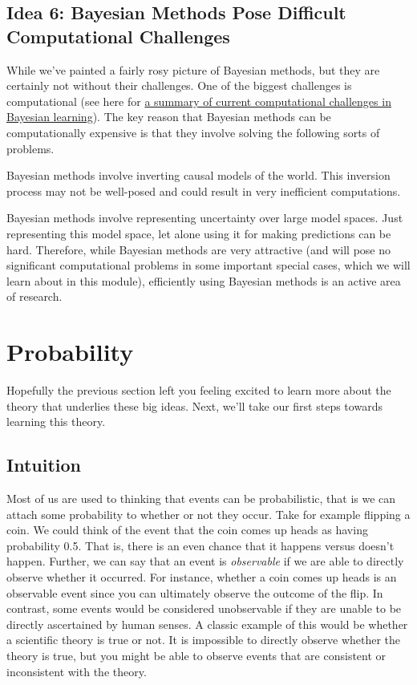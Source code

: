 \documentclass[assignment01_Solutions]{subfiles}
\begin{document}
\subsection*{Idea 6: Bayesian Methods Pose Difficult Computational Challenges}
While we've painted a fairly rosy picture of Bayesian methods, but they are certainly not without their challenges.  One of the biggest challenges is computational (see here for \href{https://link.springer.com/article/10.1007/s11222-015-9574-5}{a summary of current computational challenges in Bayesian learning}).  The key reason that Bayesian methods can be computationally expensive is that they involve solving the following sorts of problems.
\bi
\item Bayesian methods involve inverting causal models of the world.  This inversion process may not be well-posed and could result in very inefficient computations.
\item Bayesian methods involve representing uncertainty over large model spaces.  Just representing this model space, let alone using it for making predictions can be hard.
\ei
Therefore, while Bayesian methods are very attractive (and will pose no significant computational problems in some important special cases, which we will learn about in this module), efficiently using Bayesian methods is an active area of research.

\section{Probability}

Hopefully the previous section left you feeling excited to learn more about the theory that underlies these big ideas.  Next, we'll take our first steps towards learning this theory.

\subsection{Intuition}
Most of us are used to thinking that events can be probabilistic, that is we can attach some probability to whether or not they occur.  Take for example flipping a coin.  We could think of the event that the coin comes up heads as having probability 0.5.  That is, there is an even chance that it happens versus doesn’t happen.  Further, we can say that an event is \emph{observable} if we are able to directly observe whether it occurred.  For instance, whether a coin comes up heads is an observable event since you can ultimately observe the outcome of the flip.  In contrast, some events would be considered unobservable if they are unable to be directly ascertained by human senses.  A classic example of this would be whether a scientific theory is true or not.  It is impossible to directly observe whether the theory is true, but you might be able to observe events that are consistent or inconsistent with the theory.
\end{document}
